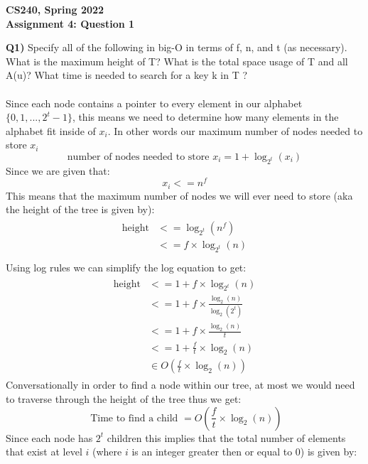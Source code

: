 \documentclass[12pt]{article}
\begin{document}
\begin{center}
{\Large\textbf{CS240, Spring 2022}}\\
\vspace{2mm}
{\Large\textbf{Assignment 4: Question 1}}\\
\vspace{3mm}
\end{center}
\begin{adjustwidth}{0em}{0pt}
\textbf{Q1)} Specify all of the following in big-O in terms of f, n, and t (as necessary). What is the maximum height of T? What is the total space usage of T and all A(u)? What time is needed to search for a key k in T ? \\\\
Since each node contains a pointer to every element in our alphabet $\{0, 1, ..., 2^t-1\}$, this means we need to determine how many elements in the alphabet fit inside of $x_i$. In other words our maximum number of nodes needed to store $x_i$
\[ \text{number of nodes needed to store } x_i = 1 + \log_{2^t}(x_i)\]
Since we are given that:
\[ x_i <= n^f \]
This means that the maximum number of nodes we will ever need to store (aka the height of the tree is given by):
\begin{align*}
    \begin{aligned}
       \text{height} &<= \log_{2^t}(n^f) \\
       &<= f\times\log_{2^t}(n) \\
    \end{aligned}
\end{align*}
Using log rules we can simplify the log equation to get:
\begin{align*}
    \begin{aligned}
       \text{height} &<= 1 + f\times\log_{2^t}(n) \\
       &<= 1 + f\times\frac{\log_{2}(n)}{\log_{2}(2^t)} \\
       &<= 1+ f\times\frac{\log_{2}(n)}{t} \\
       &<= 1+ \frac{f}{t}\times\log_{2}(n) \\
       &\in O(\frac{f}{t}\times\log_{2}(n))
    \end{aligned}
\end{align*}
Conversationally in order to find a node within our tree, at most we would need to traverse through the height of the tree thus we get:
\[ \text{ Time to find a child } = O(\frac{f}{t}\times\log_{2}(n)) \]
Since each node has $2^t$ children this implies that the total number of elements that exist at level $i$ (where $i$ is an integer greater then or equal to 0) is given by:

\end{adjustwidth}
\end{document}
